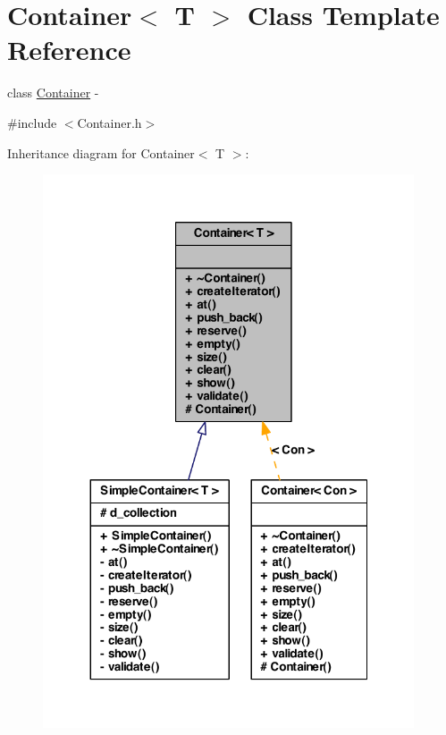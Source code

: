 \hypertarget{class_container}{
\section{Container$<$ T $>$ Class Template Reference}
\label{class_container}
}


class \hyperlink{class_container}{Container} -\/  




{\ttfamily \#include $<$Container.h$>$}



Inheritance diagram for Container$<$ T $>$:
\nopagebreak
\begin{figure}[H]
\begin{center}
\leavevmode
\includegraphics[width=311pt]{class_container__inherit__graph}
\end{center}
\end{figure}

